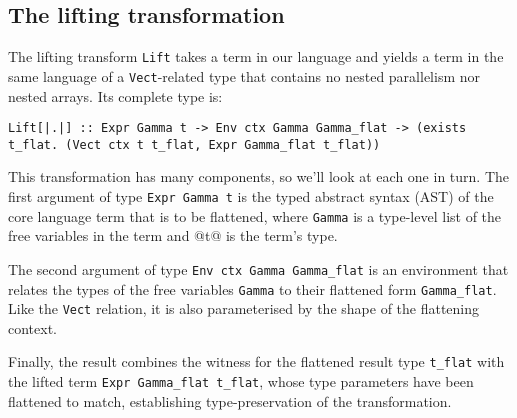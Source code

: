 \subsection{The lifting transformation}

The lifting transform \lstinline[style=ndp]{Lift} takes a term in our language and yields a term in the same language of a \lstinline[style=ndp]{Vect}-related type that contains no nested parallelism nor nested arrays. Its complete type is:
%
\begin{lstlisting}[style=ndp]
Lift[|.|] :: Expr Gamma t -> Env ctx Gamma Gamma_flat -> (exists t_flat. (Vect ctx t t_flat, Expr Gamma_flat t_flat))
\end{lstlisting}
%
This transformation has many components, so we'll look at each one in turn. The first argument of type \lstinline[style=ndp]{Expr Gamma t} is the typed abstract syntax (AST) of the core language term that is to be flattened, where \lstinline[style=ndp]{Gamma} is a type-level list of the free variables in the term and @t@ is the term's type.

The second argument of type \lstinline[style=ndp]{Env ctx Gamma Gamma_flat} is an environment that relates the types of the free variables \lstinline[style=ndp]{Gamma} to their flattened form \lstinline[style=ndp]{Gamma_flat}. Like the \lstinline[style=ndp]{Vect} relation, it is also parameterised by the shape of the flattening context.

Finally, the result combines the witness for the flattened result type \lstinline[style=ndp]{t_flat} with the lifted term \lstinline[style=ndp]{Expr Gamma_flat t_flat}, whose type parameters have been flattened to match, establishing type-preservation of the transformation.


